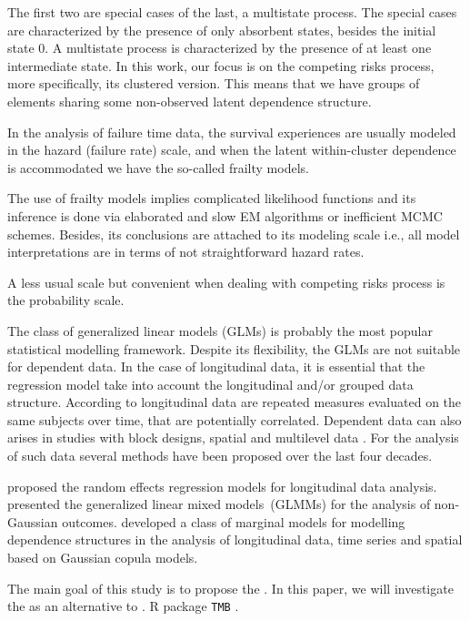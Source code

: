 \documentclass[a4paper,12pt]{article}
\begin{document}
The first two are special cases of the last, a multistate process. The
special cases are characterized by the presence of only absorbent
states, besides the initial state 0. A multistate process is
characterized by the presence of at least one intermediate state. In
this work, our focus is on the competing risks process, more
specifically, its clustered version. This means that we have groups of
elements sharing some non-observed latent dependence structure.

In the analysis of failure time data, the survival experiences are
usually modeled in the hazard (failure rate) scale, and when the latent
within-cluster dependence is accommodated we have the so-called frailty
models.

The use of frailty models implies complicated likelihood functions and
its inference is done via elaborated and slow EM algorithms or
inefficient MCMC schemes. Besides, its conclusions are attached to its
modeling scale i.e., all model interpretations are in terms of not
straightforward hazard rates.

A less usual scale but convenient when dealing with competing risks
process is the probability scale.

The class of generalized linear models (GLMs) \citep{GLM72} is probably
the most popular statistical modelling framework. Despite its
flexibility, the GLMs are not suitable for dependent data. In the case
of longitudinal data, it is essential that the regression model take
into account the longitudinal and/or grouped data structure. According
to \cite{diggle02} longitudinal data are repeated measures evaluated on
the same subjects over time, that are potentially correlated. Dependent
data can also arises in studies with block designs, spatial and
multilevel data \citep{verbeke&molenberghs,fitzmaurice}. For the
analysis of such data several methods have been proposed over the last
four decades.

\cite{laird82} proposed the random effects regression models for
longitudinal data analysis. \cite{breslow93} presented the generalized
linear mixed models~(GLMMs) for the analysis of non-Gaussian
outcomes. \cite{gcmr} developed a class of marginal models for modelling
dependence structures in the analysis of longitudinal data, time series
and spatial based on Gaussian copula models.

The main goal of this study is to propose the . In this paper, we will
investigate the as an alternative to . R \citep{R21} package
\texttt{TMB} \citep{TMb}.
\end{document}
